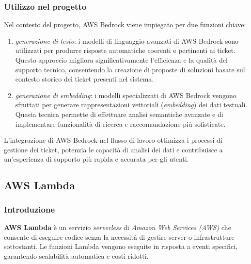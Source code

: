 \subsubsection{Utilizzo nel progetto}
Nel contesto del progetto, AWS Bedrock viene impiegato per due funzioni chiave:
\begin{enumerate}
    \item \textit{generazione di testo}: i modelli di linguaggio avanzati di AWS Bedrock sono utilizzati per produrre risposte automatiche coerenti e pertinenti ai ticket. Questo approccio migliora significativamente l’efficienza e la qualità del supporto tecnico, consentendo la creazione di proposte di soluzioni basate sul contesto storico dei ticket presenti nel sistema.
    \item \textit{generazione di \textit{embedding}}: i modelli specializzati di AWS Bedrock vengono sfruttati per generare rappresentazioni vettoriali (\textit{embedding}) dei dati testuali. Questa tecnica permette di effettuare analisi semantiche avanzate e di implementare funzionalità di ricerca e raccomandazione più sofisticate.
\end{enumerate}
L’integrazione di AWS Bedrock nel flusso di lavoro ottimizza i processi di gestione dei ticket, potenzia le capacità di analisi dei dati e contribuisce a un’esperienza di supporto più rapida e accurata per gli utenti.

\subsection{AWS Lambda}

\subsubsection{Introduzione}
\textbf{AWS Lambda} è un servizio \textit{serverless} di \textit{Amazon Web Services (AWS)} che consente di eseguire codice senza la necessità di gestire server o infrastrutture sottostanti. Le funzioni Lambda vengono eseguite in risposta a eventi specifici, garantendo scalabilità automatica e costi ridotti.

